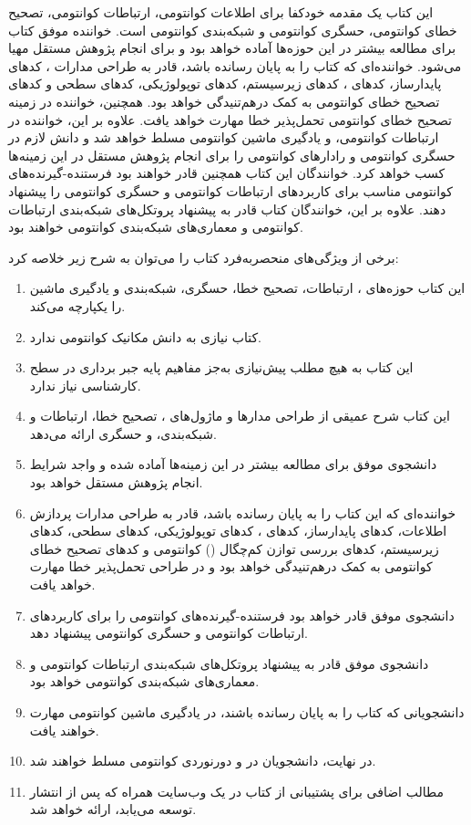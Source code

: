 این کتاب یک مقدمه خودکفا برای اطلاعات کوانتومی، ارتباطات کوانتومی، تصحیح خطای کوانتومی، حسگری کوانتومی و شبکه‌بندی کوانتومی است. خواننده موفق کتاب برای مطالعه بیشتر در این حوزه‌ها آماده خواهد بود و برای انجام پژوهش مستقل مهیا می‌شود. خواننده‌ای که کتاب را به پایان رسانده باشد، قادر به طراحی مدارات ، کدهای پایدارساز، کدهای ، کدهای زیرسیستم، کدهای توپولوژیکی، کدهای سطحی و کدهای تصحیح خطای کوانتومی به کمک درهم‌تنیدگی خواهد بود. همچنین، خواننده در زمینه تصحیح خطای کوانتومی تحمل‌پذیر خطا مهارت خواهد یافت. علاوه بر این، خواننده در ارتباطات کوانتومی،  و یادگیری ماشین کوانتومی مسلط خواهد شد و دانش لازم در حسگری کوانتومی و رادارهای کوانتومی را برای انجام پژوهش مستقل در این زمینه‌ها کسب خواهد کرد. خوانندگان این کتاب همچنین قادر خواهند بود فرستنده-گیرنده‌های کوانتومی مناسب برای کاربردهای ارتباطات کوانتومی و حسگری کوانتومی را پیشنهاد دهند. علاوه بر این، خوانندگان کتاب قادر به پیشنهاد پروتکل‌های شبکه‌بندی ارتباطات کوانتومی و معماری‌های شبکه‌بندی کوانتومی خواهند بود.

برخی از ویژگی‌های منحصر‌به‌فرد کتاب را می‌توان به شرح زیر خلاصه کرد:
\begin{enumerate}
	\item این کتاب حوزه‌های ، ارتباطات، تصحیح خطا، حسگری، شبکه‌بندی و یادگیری ماشین را یکپارچه می‌کند.
	\item کتاب نیازی به دانش مکانیک کوانتومی ندارد.
	\item این کتاب به هیچ مطلب پیش‌نیازی به‌جز مفاهیم پایه جبر برداری در سطح کارشناسی نیاز ندارد.
	\item این کتاب شرح عمیقی از طراحی مدارها و ماژول‌های ، تصحیح خطا، ارتباطات و شبکه‌بندی، و حسگری ارائه می‌دهد.
	\item دانشجوی موفق برای مطالعه بیشتر در این زمینه‌ها آماده شده و واجد شرایط انجام پژوهش مستقل خواهد بود.
	\item خواننده‌ای که این کتاب را به پایان رسانده باشد، قادر به طراحی مدارات پردازش اطلاعات، کدهای پایدارساز، کدهای ، کدهای توپولوژیکی، کدهای سطحی، کدهای زیرسیستم، کدهای بررسی توازن کم‌چگال () کوانتومی و کدهای تصحیح خطای کوانتومی به کمک درهم‌تنیدگی خواهد بود و در طراحی تحمل‌پذیر خطا مهارت خواهد یافت.
	\item دانشجوی موفق قادر خواهد بود فرستنده-گیرنده‌های کوانتومی را برای کاربردهای ارتباطات کوانتومی و حسگری کوانتومی پیشنهاد دهد.
	\item دانشجوی موفق قادر به پیشنهاد پروتکل‌های شبکه‌بندی ارتباطات کوانتومی و معماری‌های شبکه‌بندی کوانتومی خواهد بود.
	\item دانشجویانی که کتاب را به پایان رسانده باشند، در یادگیری ماشین کوانتومی مهارت خواهند یافت.
	\item در نهایت، دانشجویان در  و دورنوردی کوانتومی مسلط خواهند شد.
	\item مطالب اضافی برای پشتیبانی از کتاب در یک وب‌سایت همراه که پس از انتشار توسعه می‌یابد، ارائه خواهد شد.
\end{enumerate}

